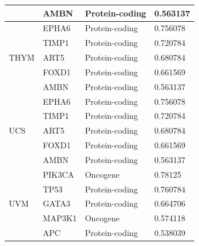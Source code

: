 \begin{table}
\begin{center}
{\begin{tabular}{l|l|l|l}
        & AMBN & Protein-coding & 0.563137 \\ %
        \midrule
        \multirow{5}{*}{THYM}& EPHA6 & Protein-coding & 0.756078 \\ %
        & TIMP1 & Protein-coding & 0.720784 \\ %
        & ART5 & Protein-coding & 0.680784 \\ %
        & FOXD1 & Protein-coding & 0.661569 \\ %
        & AMBN & Protein-coding & 0.563137 \\ %
        \midrule
        \multirow{5}{*}{UCS}& EPHA6 & Protein-coding & 0.756078 \\ %
        & TIMP1 & Protein-coding & 0.720784 \\ %
        & ART5 & Protein-coding & 0.680784 \\ %
        & FOXD1 & Protein-coding & 0.661569 \\ %
        & AMBN & Protein-coding & 0.563137 \\ %
        \midrule
        \multirow{5}{*}{UVM} & PIK3CA & Oncogene & 0.78125 \\ %
        & TP53 & Protein-coding & 0.760784 \\ %
        & GATA3  & Protein-coding & 0.664706 \\ %
        & MAP3K1  & Oncogene & 0.574118 \\ %
        & APC  & Protein-coding & 0.538039 \\ 
        \end{tabular}}
        \vspace{-4mm}
    \end{center}
\end{table}

